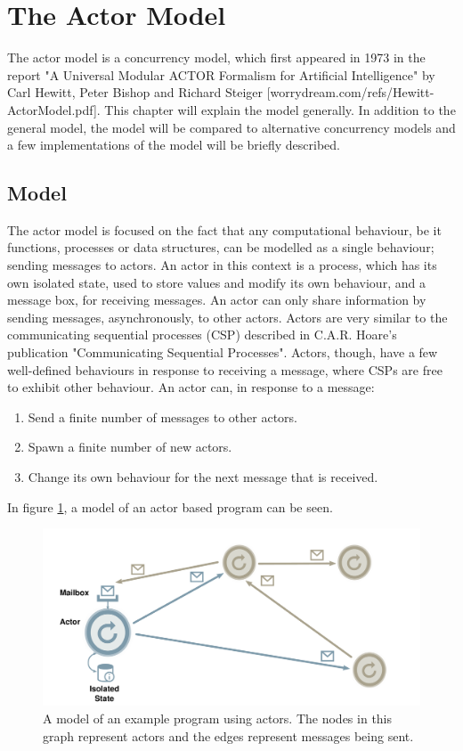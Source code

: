 \section{The Actor Model}
The actor model is a concurrency model, which first appeared in 1973 in the report "A Universal Modular ACTOR Formalism for Artificial Intelligence" by Carl Hewitt, Peter Bishop and Richard Steiger [worrydream.com/refs/Hewitt-ActorModel.pdf]. This chapter will explain the model generally. In addition to the general model, the model will be compared to alternative concurrency models and a few implementations of the model will be briefly described.

\subsection{Model}
The actor model is focused on the fact that any computational behaviour, be it functions, processes or data structures, can be modelled as a single behaviour; sending messages to actors.
An actor in this context is a process, which has its own isolated state, used to store values and modify its own behaviour, and a message box, for receiving messages. An actor can only share information by sending messages, asynchronously, to other actors.
Actors are very similar to the communicating sequential processes (CSP) described in C.A.R. Hoare's publication "Communicating Sequential Processes". Actors, though, have a few well-defined behaviours in response to receiving a message, where CSPs are free to exhibit other behaviour. An actor can, in response to a message: 

\begin{enumerate}
  \item Send a finite number of messages to other actors.
  \item Spawn a finite number of new actors.
  \item Change its own behaviour for the next message that is received.
\end{enumerate}

In figure \ref{fig:actor}, a model of an actor based program can be seen.

\begin{figure}
  \includegraphics[width=\textwidth]{Images/actors.pdf}
  \caption{A model of an example program using actors. The nodes in this graph represent actors and the edges represent messages being sent.}
  \label{fig:actor}
\end{figure}

